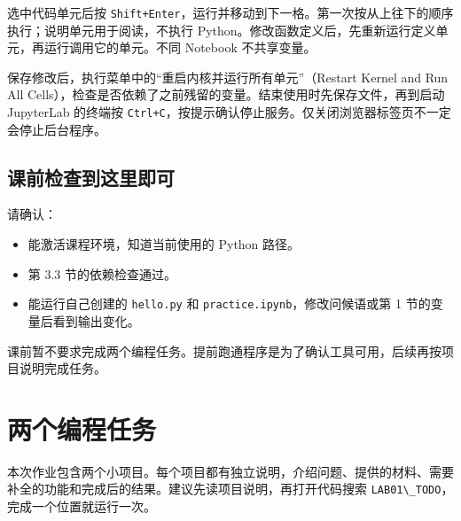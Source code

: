 \documentclass[UTF8,a4paper,11pt,fontset=fandol]{ctexart}
\providecommand{\tightlist}{\setlength{\itemsep}{0pt}\setlength{\parskip}{0pt}}
\providecommand{\passthrough}[1]{#1}
\begin{document}
选中代码单元后按 \passthrough{\lstinline!Shift+Enter!}，运行并移动到下一格。第一次按从上往下的顺序执行；说明单元用于阅读，不执行 Python。修改函数定义后，先重新运行定义单元，再运行调用它的单元。不同 Notebook 不共享变量。

保存修改后，执行菜单中的``重启内核并运行所有单元''（Restart Kernel and Run All Cells），检查是否依赖了之前残留的变量。结束使用时先保存文件，再到启动 JupyterLab 的终端按 \passthrough{\lstinline!Ctrl+C!}，按提示确认停止服务。仅关闭浏览器标签页不一定会停止后台程序。

\subsection{课前检查到这里即可}\label{ux8bfeux524dux68c0ux67e5ux5230ux8fd9ux91ccux5373ux53ef}

请确认：

\begin{itemize}
\tightlist
\item
  能激活课程环境，知道当前使用的 Python 路径。
\item
  第 3.3 节的依赖检查通过。
\item
  能运行自己创建的 \passthrough{\lstinline!hello.py!} 和 \passthrough{\lstinline!practice.ipynb!}，修改问候语或第 1 节的变量后看到输出变化。
\end{itemize}

课前暂不要求完成两个编程任务。提前跑通程序是为了确认工具可用，后续再按项目说明完成任务。

\clearpage

\section{两个编程任务}\label{ux4e24ux4e2aux7f16ux7a0bux4efbux52a1}

本次作业包含两个小项目。每个项目都有独立说明，介绍问题、提供的材料、需要补全的功能和完成后的结果。建议先读项目说明，再打开代码搜索 \passthrough{\lstinline!LAB01\_TODO!}，完成一个位置就运行一次。
\end{document}

